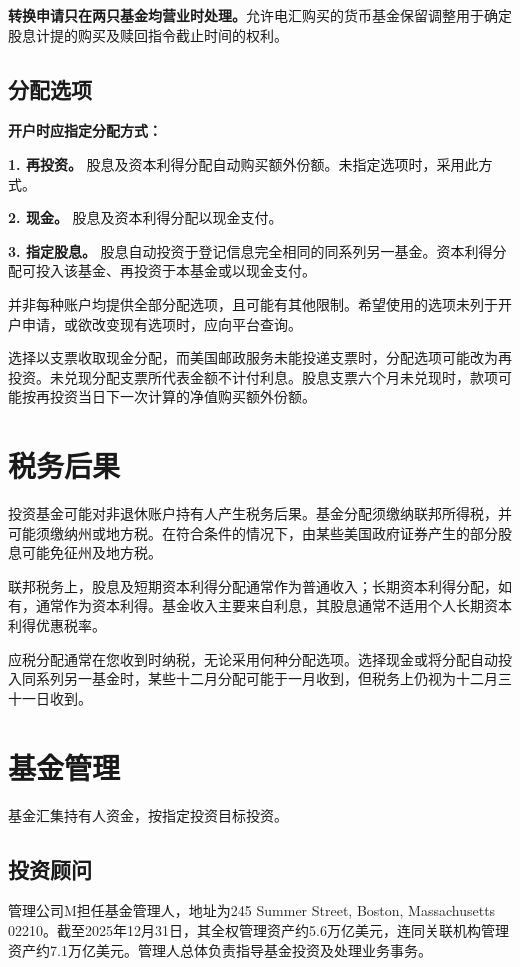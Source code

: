 \documentclass[UTF8,fontset=none,11pt,a4paper]{ctexart}
\begin{document}
\textbf{转换申请只在两只基金均营业时处理。}允许电汇购买的货币基金保留调整用于确定股息计提的购买及赎回指令截止时间的权利。


\subsection*{分配选项}
\textbf{开户时应指定分配方式：}


\textbf{1. 再投资。} 股息及资本利得分配自动购买额外份额。未指定选项时，采用此方式。


\textbf{2. 现金。} 股息及资本利得分配以现金支付。


\textbf{3. 指定股息。} 股息自动投资于登记信息完全相同的同系列另一基金。资本利得分配可投入该基金、再投资于本基金或以现金支付。


并非每种账户均提供全部分配选项，且可能有其他限制。希望使用的选项未列于开户申请，或欲改变现有选项时，应向平台查询。


选择以支票收取现金分配，而美国邮政服务未能投递支票时，分配选项可能改为再投资。未兑现分配支票所代表金额不计付利息。股息支票六个月未兑现时，款项可能按再投资当日下一次计算的净值购买额外份额。


\section*{税务后果}
投资基金可能对非退休账户持有人产生税务后果。基金分配须缴纳联邦所得税，并可能须缴纳州或地方税。在符合条件的情况下，由某些美国政府证券产生的部分股息可能免征州及地方税。


联邦税务上，股息及短期资本利得分配通常作为普通收入；长期资本利得分配，如有，通常作为资本利得。基金收入主要来自利息，其股息通常不适用个人长期资本利得优惠税率。


应税分配通常在您收到时纳税，无论采用何种分配选项。选择现金或将分配自动投入同系列另一基金时，某些十二月分配可能于一月收到，但税务上仍视为十二月三十一日收到。


\section*{基金管理}
基金汇集持有人资金，按指定投资目标投资。


\subsection*{投资顾问}
管理公司M担任基金管理人，地址为245 Summer Street, Boston, Massachusetts 02210。截至2025年12月31日，其全权管理资产约5.6万亿美元，连同关联机构管理资产约7.1万亿美元。管理人总体负责指导基金投资及处理业务事务。
\end{document}
